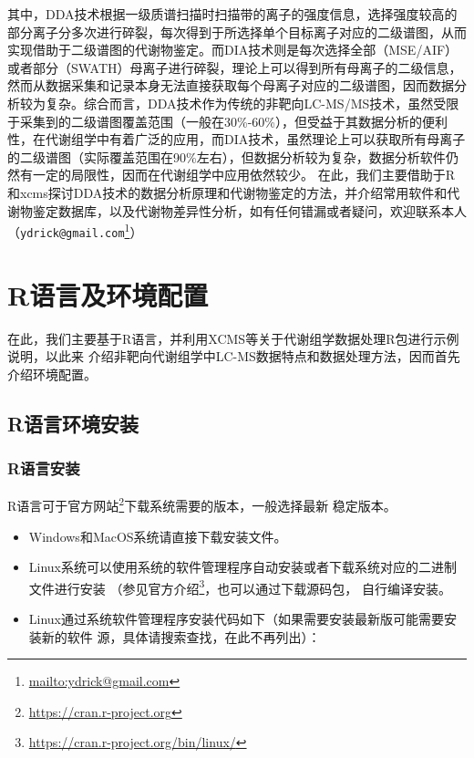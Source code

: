 \documentclass[]{ctexbook}
\providecommand{\tightlist}{%
  \setlength{\itemsep}{0pt}\setlength{\parskip}{0pt}}
\renewcommand{\href}[2]{#2\footnote{\url{#1}}}
\begin{document}
其中，DDA技术根据一级质谱扫描时扫描带的离子的强度信息，选择强度较高的部分离子分多次进行碎裂，每次得到于所选择单个目标离子对应的二级谱图，从而实现借助于二级谱图的代谢物鉴定。而DIA技术则是每次选择全部（MSE/AIF）或者部分（SWATH）母离子进行碎裂，理论上可以得到所有母离子的二级信息，然而从数据采集和记录本身无法直接获取每个母离子对应的二级谱图，因而数据分析较为复杂。综合而言，DDA技术作为传统的非靶向LC-MS/MS技术，虽然受限于采集到的二级谱图覆盖范围（一般在30\%-60\%），但受益于其数据分析的便利性，在代谢组学中有着广泛的应用，而DIA技术，虽然理论上可以获取所有母离子的二级谱图（实际覆盖范围在90\%左右），但数据分析较为复杂，数据分析软件仍然有一定的局限性，因而在代谢组学中应用依然较少。
在此，我们主要借助于R和xcms探讨DDA技术的数据分析原理和代谢物鉴定的方法，并介绍常用软件和代谢物鉴定数据库，以及代谢物差异性分析，如有任何错漏或者疑问，欢迎联系本人（\href{mailto:ydrick@gmail.com}{\nolinkurl{ydrick@gmail.com}}）

\mainmatter

\hypertarget{basis}{%
\chapter{R语言及环境配置}\label{basis}}

在此，我们主要基于R语言，并利用XCMS等关于代谢组学数据处理R包进行示例说明，以此来
介绍非靶向代谢组学中LC-MS数据特点和数据处理方法，因而首先介绍环境配置。

\hypertarget{r}{%
\section{R语言环境安装}\label{r}}

\hypertarget{r}{%
\subsection{R语言安装}\label{r}}

R语言可于\href{https://cran.r-project.org}{官方网站}下载系统需要的版本，一般选择最新
稳定版本。

\begin{itemize}
\tightlist
\item
  Windows和MacOS系统请直接下载安装文件。
\item
  Linux系统可以使用系统的软件管理程序自动安装或者下载系统对应的二进制文件进行安装
  （参见\href{https://cran.r-project.org/bin/linux/}{官方介绍}，也可以通过下载源码包，
  自行编译安装。
\item
  Linux通过系统软件管理程序安装代码如下（如果需要安装最新版可能需要安装新的软件
  源，具体请搜索查找，在此不再列出）：
\end{itemize}
\end{document}
